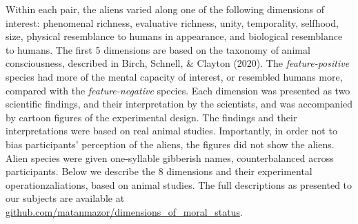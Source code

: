 \documentclass[10pt, letterpaper]{article}
\begin{document}
Within each pair, the aliens varied along one of the following
dimensions of interest: phenomenal richness, evaluative richness, unity,
temporality, selfhood, size, physical resemblance to humans in
appearance, and biological resemblance to humans. The first 5 dimensions
are based on the taxonomy of animal consciousness, described in Birch,
Schnell, \& Clayton (2020). The \emph{feature-positive} species had more
of the mental capacity of interest, or resembled humans more, compared
with the \emph{feature-negative} species. Each dimension was presented
as two scientific findings, and their interpretation by the scientists,
and was accompanied by cartoon figures of the experimental design. The
findings and their interpretations were based on real animal studies.
Importantly, in order not to bias participants' perception of the
aliens, the figures did not show the aliens. Alien species were given
one-syllable gibberish names, counterbalanced across participants. Below
we describe the 8 dimensions and their experimental operationzaliations,
based on animal studies. The full descriptions as presented to our
subjects are available at
\href{https://github.com/matanmazor/dimensions_of_moral_status}{github.com/matanmazor/dimensions\_of\_moral\_status}.
\end{document}
